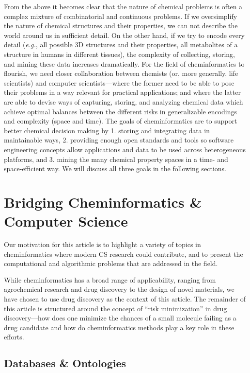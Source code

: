 \documentclass{sig-alternate}
\begin{document}
From the above it becomes clear that the nature of chemical problems
is often a complex mixture of combinatorial and continuous
problems. If we oversimplify the nature of chemical structures and
their properties, we can not describe the world around us in
sufficient detail. On the other hand, if we try to encode every detail
(\emph{e.g.}, all possible 3D structures and their properties, all
metabolites of a structure in humans in different tissues), the
complexity of collecting, storing, and mining these data increases
dramatically. For the field of cheminformatics to flourish, we need
closer collaboration between chemists (or, more generally, life
scientists) and computer scientists---where the former need to be able
to pose their problems in a way relevant for practical applications;
and where the latter are able to devise ways of capturing, storing,
and analyzing chemical data which achieve optimal balances between the different risks in 
generalizable encodings and complexity (space and time). The goals of cheminformatics are to
support better chemical decision making by 1. storing and integrating
data in maintainable ways, 2.  providing enough open standards and
tools so software engineering concepts allow applications and data to
be used across heterogeneous platforms, and 3. mining the many
chemical property spaces in a time- and space-efficient way. We will
discuss all three goals in the following sections.

\section{Bridging Cheminformatics \& Computer Science}

Our motivation for this article is to highlight a variety of topics in
cheminformatics where modern CS research could contribute, and
to present the computational and algorithmic problems
that are addressed in the field.

While cheminformatics has a broad range of applicability, ranging from
agrochemical research and drug discovery to the design of novel
materials, we have chosen to use drug discovery as the context of this
article. The remainder of this article is structured around the
concept of ``risk minimization'' in drug discovery---how does one
minimize the chances of a small molecule failing as a drug candidate
and how do cheminformatics methods play a key role in these efforts.

\subsection{Databases \& Ontologies}
\label{sec:databases}
\end{document}
